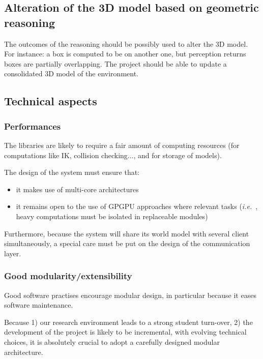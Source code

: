 \documentclass[a4paper]{article}
\newcommand{\ie}{{\textit{i.e.\ }}}
\begin{document}
\subsection{Alteration of the 3D model based on geometric reasoning}


The outcomes of the reasoning should be possibly used to alter the 3D
model. For instance: a box is computed to be on another one, but perception
returns boxes are partially overlapping. The project should be able to update a
consolidated 3D model of the environment. 

\subsection{Technical aspects}

\subsubsection{Performances}

The libraries are likely to require a fair amount of computing resources (for
computations like IK, collision checking..., and for storage of models).

The design of the system must ensure that:
\begin{itemize}
    \item it makes use of multi-core architectures

    \item it remains open to the use of GPGPU approaches where relevant tasks
        (\ie, heavy computations must be isolated in replaceable modules)

\end{itemize}

Furthermore, because the system will share its world model with several client
simultaneously, a special care must be put on the design of the communication
layer.


\subsubsection{Good modularity/extensibility}

Good software practises encourage modular design, in particular because it
eases software maintenance.

Because 1) our research environment leads to a strong student turn-over, 2) the
development of the project is likely to be incremental, with evolving technical
choices, it is absolutely crucial to adopt a carefully designed modular
architecture.
\end{document}
